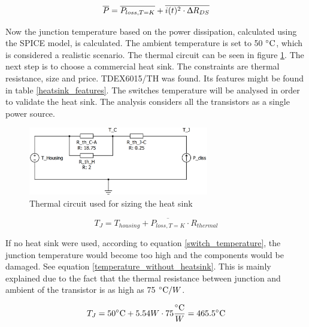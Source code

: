 \begin{equation} \label{total_losses}
\overline{P} = \overline{P_{loss, T = K}} + \overline{i(t)^2 \cdot \Updelta R_{DS}}
\end{equation}

Now the junction temperature based on the power dissipation, calculated using the SPICE model, is calculated. The ambient temperature is set to 50 $\decC$, which is considered a realistic scenario. The thermal circuit can be seen in figure \ref{thermal_circuit}. The next step is to choose a commercial heat sink. The constraints are thermal resistance, size and price. TDEX6015/TH was found. Its features might be found in table \ref{heatsink_features}. The switches temperature will be analysed in order to validate the heat sink. The analysis considers all the transistors as a single power source.

\begin{figure}[H]
	\begin{center}
		\includegraphics[width=0.7\textwidth]{../Pictures/thermal_circuit.png}
		\caption{Thermal circuit used for sizing the heat sink}
		\label{thermal_circuit}
	\end{center}	
\end{figure}

\begin{equation} \label{switch_temperature}
T_{J} = T_{housing} + \overline{P_{loss, T = K}} \cdot  R_{thermal}
\end{equation}


If no heat sink were used, according to equation \ref{switch_temperature}, the junction temperature would become too high and the components would be damaged. See equation \ref{temperature_without_heatsink}. This is mainly explained due to the fact that the thermal resistance between junction and ambient of the transistor is as high as 75 $\decC / W$.

\begin{equation} \label{temperature_without_heatsink}
T_{J} = 50 \decC + 5.54 W \cdot 75 \frac{\decC}{W} = 465.5 \decC
\end{equation}


